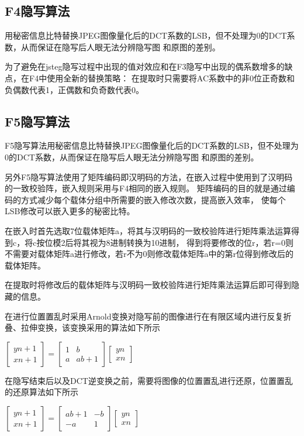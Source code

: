 \documentclass[a4paper,11pt,UTF8]{ctexart}
\begin{document}
  \subsection{F4隐写算法}
    用秘密信息比特替换JPEG图像量化后的DCT系数的LSB，但不处理为0的DCT系数，从而保证在隐写后人眼无法分辨隐写图
    和原图的差别。\par
    为了避免在jsteg隐写过程中出现的值对效应和在F3隐写中出现的偶系数增多的缺点，在F4中使用全新的替换策略：
    在提取时只需要将AC系数中的非0位正奇数和负偶数代表1，正偶数和负奇数代表0。

  \subsection{F5隐写算法}
    F5隐写算法用秘密信息比特替换JPEG图像量化后的DCT系数的LSB，但不处理为0的DCT系数，从而保证在隐写后人眼无法分辨隐写图
    和原图的差别。\par
    另外F5隐写算法使用了矩阵编码即汉明码的方法，在嵌入过程中使用到了汉明码的一致校验阵，嵌入规则采用与F4相同的嵌入规则。
    矩阵编码的目的就是通过编码的方式减少每个载体分组中所需要的嵌入修改次数，提高嵌入效率，
    使每个LSB修改可以嵌入更多的秘密比特。\par
    在嵌入时首先选取7位载体矩阵a，将其与汉明码的一致校验阵进行矩阵乘法运算得到c，将c按位模2后将其视为8进制转换为10进制，
    得到将要修改的位r，若r=0则不需要对载体矩阵a进行修改，若r不为0则修改载体矩阵a中的第r位得到修改后的载体矩阵。\par
    在提取时将修改后的载体矩阵与汉明码一致校验阵进行矩阵乘法运算后即可得到隐藏的信息。\par
    在进行位置置乱时采用Arnold变换对隐写前的图像进行在有限区域内进行反复折叠、拉伸变换，该变换采用的算法如下所示 \par
    $\begin{bmatrix}y{n+1 }  \\x{ n+1}  \end{bmatrix}=\begin{bmatrix}1  &b \\a  &ab+1\end{bmatrix}\begin{bmatrix}y{n}  \\x{ n} \end{bmatrix}$\par
    在隐写结束后以及DCT逆变换之前，需要将图像的位置置乱进行还原，位置置乱的还原算法如下所示\par
    $\begin{bmatrix}y{ n+1 }  \\x{n+1}  \end{bmatrix}=\begin{bmatrix}ab+1  &-b \\-a  &1\end{bmatrix}\begin{bmatrix}y{n}  \\x{n} \end{bmatrix}$\par
\end{document}
